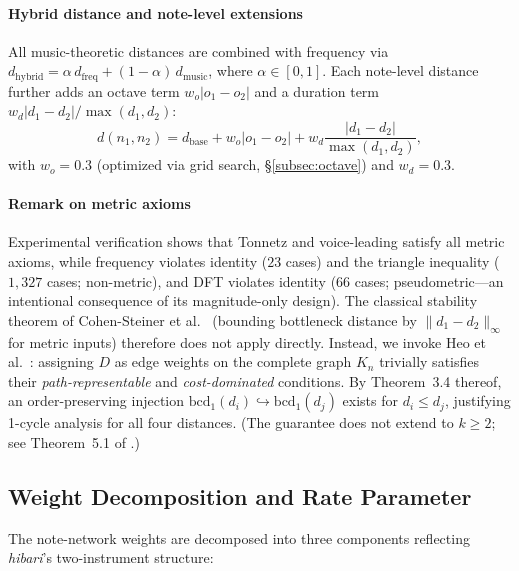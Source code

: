 \documentclass[conference,10pt,a4paper]{IEEEtran}
\begin{document}
\paragraph{Hybrid distance and note-level extensions}
All music-theoretic distances are combined with frequency via
$d_{\mathrm{hybrid}} = \alpha\, d_{\mathrm{freq}} + (1-\alpha)\, d_{\mathrm{music}}$,
where $\alpha \in [0,1]$.  Each note-level distance further adds an
octave term $w_o |o_1 - o_2|$ and a duration term
$w_d |d_1 - d_2| / \max(d_1, d_2)$:
\begin{equation}
d(n_1, n_2) = d_{\mathrm{base}} + w_o |o_1 - o_2| + w_d \frac{|d_1 - d_2|}{\max(d_1, d_2)},
\end{equation}
with $w_o = 0.3$ (optimized via grid search, \S\ref{subsec:octave})
and $w_d = 0.3$.

\paragraph{Remark on metric axioms}
\label{para:metric_axioms}
Experimental verification shows that Tonnetz and voice-leading satisfy all
metric axioms, while frequency violates identity ($23$ cases) and the triangle
inequality ($1{,}327$ cases; non-metric), and DFT violates identity
($66$ cases; pseudometric---an intentional consequence of its magnitude-only
design).
The classical stability theorem of Cohen-Steiner et al.\ \cite{cohensteiner2007}
(bounding bottleneck distance by $\|d_1-d_2\|_\infty$ for metric inputs)
therefore does not apply directly.
Instead, we invoke Heo et al.\ \cite{heo2025}: assigning $D$ as edge
weights on the complete graph $K_n$ trivially satisfies their
\emph{path-representable} and \emph{cost-dominated} conditions.
By Theorem~3.4 thereof, an order-preserving injection
$\mathrm{bcd}_1(d_i)\hookrightarrow\mathrm{bcd}_1(d_j)$ exists for $d_i\le d_j$,
justifying 1-cycle analysis for all four distances.
(The guarantee does not extend to $k\ge 2$; see Theorem~5.1 of \cite{heo2025}.)

\subsection{Weight Decomposition and Rate Parameter}
\label{subsec:weights}

The note-network weights are decomposed into three components
reflecting \emph{hibari}'s two-instrument structure:
\end{document}
